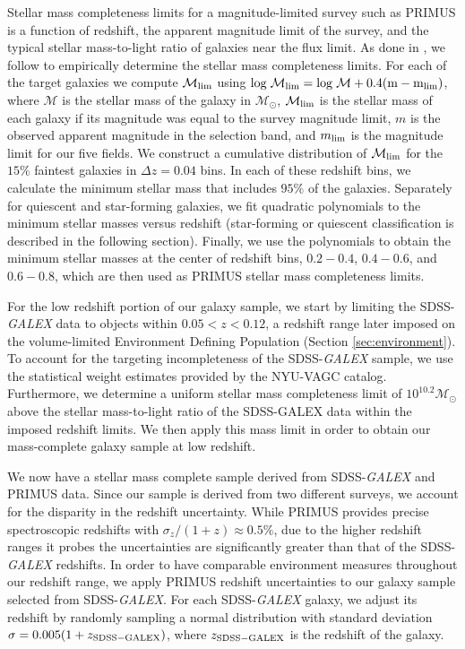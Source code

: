 \documentclass{emulateapj}
\begin{document}
Stellar mass completeness limits for a magnitude-limited survey such as PRIMUS is a function of redshift, the apparent magnitude limit of the survey, and the typical stellar mass-to-light ratio of galaxies near the flux limit. As done in \cite{Moustakas:2013aa}, we follow \cite{Pozzetti:2010aa} to empirically determine the stellar mass completeness limits. For each of the target galaxies we compute $\mathcal{M}_{\rm{lim}}$ using $\rm{log} \; \mathcal{M}_{\rm{lim}} = \rm{log} \; \mathcal{M} + 0.4 ( m - m_{\rm{lim}})$, where $\mathcal{M}$ is the stellar mass of the galaxy in $\mathcal{M_{\odot}}$, $\mathcal{M}_{\rm{lim}}$ is the stellar mass of each galaxy if its magnitude was equal to the survey magnitude limit, $m$ is the observed apparent magnitude in the selection band, and $m_{\rm{lim}}$ is the magnitude limit for our five fields. We construct a cumulative distribution of $\mathcal{M}_{\rm{lim}}$ for the $15\%$ faintest galaxies in $\Delta z=0.04$ bins. In each of these redshift bins, we calculate the minimum stellar mass that includes $95 \%$ of the galaxies. Separately for quiescent and star-forming galaxies, we fit quadratic polynomials to the minimum stellar masses versus redshift (star-forming or quiescent classification is described in the following section). Finally, we use the polynomials to obtain the minimum stellar masses at the center of redshift bins, $0.2-0.4$, $0.4-0.6$, and $0.6-0.8$, which are then used as PRIMUS stellar mass completeness limits.

For the low redshift portion of our galaxy sample, we start by limiting the SDSS-{\em GALEX} data to objects within $0.05 < z < 0.12$, a redshift range later imposed on the volume-limited Environment Defining Population (Section \ref{sec:environment}). To account for the targeting incompleteness of the SDSS-{\em GALEX} sample, we use the statistical weight estimates provided by the NYU-VAGC catalog. Furthermore, we determine a uniform stellar mass completeness limit of $10^{10.2} \mathcal{M}_{\odot}$ above the stellar mass-to-light ratio of the SDSS-{\rm GALEX} data within the imposed redshift limits. We then apply this mass limit in order to obtain our mass-complete galaxy sample at low redshift. 

We now have a stellar mass complete sample derived from SDSS-{\em GALEX} and PRIMUS data. Since our sample is derived from two different surveys, we account for the disparity in the redshift uncertainty. While PRIMUS provides precise spectroscopic redshifts with $\sigma_{z}/(1+z) \approx 0.5 \%$, due to the higher redshift ranges it probes the uncertainties are significantly greater than that of the SDSS-{\em GALEX} redshifts. In order to have comparable environment measures throughout our redshift range, we apply PRIMUS redshift uncertainties to our galaxy sample selected from SDSS-{\em GALEX}. For each SDSS-{\em GALEX} galaxy, we adjust its redshift by randomly sampling a normal distribution with standard deviation $\sigma = 0.005 (1+z_{\rm{SDSS}-GALEX})$, where $z_{\rm{SDSS}-GALEX}$ is the redshift of the galaxy. 
\end{document}
